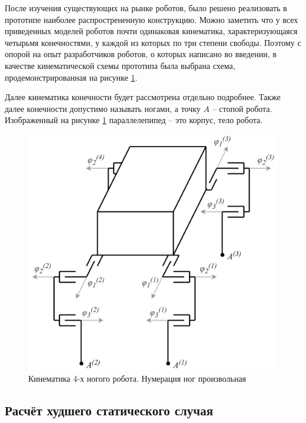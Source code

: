 После изучения существующих на рынке роботов, было решено реализовать в прототипе наиболее распрострененную конструкцию. Можно заметить что у всех приведенных моделей роботов почти одинаковая кинематика, характеризующаяся четырьмя конечностями, у каждой из которых по три степени свободы. Поэтому с опорой на опыт разработчиков роботов, о которых написано во введении, в качестве кинематической схемы прототипа была выбрана схема, продемонстрированная на рисунке \ref{fig:kin_scheme1}. 

Далее кинематика конечности будет рассмотрена отдельно подробнее. Также далее конечности допустимо называть ногами, а точку $ A $ -- стопой робота. Изображенный на рисунке \ref{fig:kin_scheme1} параллелепипед -- это корпус, тело робота.

\begin{figure}[ht]
    \centering
    \includegraphics[scale=1.2]{chapter_legged_robots/figure1.png}
    \caption{Кинематика 4-х ногого робота. Нумерация ног произвольная}
    \label{fig:kin_scheme1}
\end{figure}


\subsection{Расчёт худшего статического случая}

